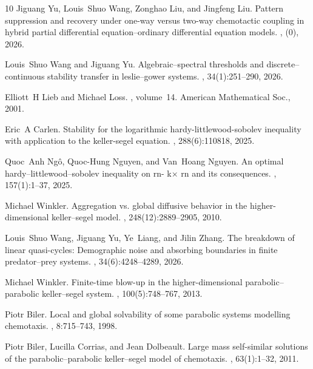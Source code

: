 \documentclass[pdflatex,sn-mathphys-num]{sn-jnl}%
\theoremstyle{thmstyleone}
\theoremstyle{thmstyletwo}
\theoremstyle{thmstylethree}
\begin{document}
\begin{thebibliography}{10}
Jiguang Yu, Louis~Shuo Wang, Zonghao Liu, and Jingfeng Liu.
\newblock Pattern suppression and recovery under one-way versus two-way chemotactic coupling in hybrid partial differential equation--ordinary differential equation models.
, (0), 2026.

Louis~Shuo Wang and Jiguang Yu.
\newblock Algebraic--spectral thresholds and discrete--continuous stability transfer in leslie--gower systems.
, 34(1):251--290, 2026.

Elliott~H Lieb and Michael Loss.
, volume~14.
\newblock American Mathematical Soc., 2001.

Eric~A Carlen.
\newblock Stability for the logarithmic hardy-littlewood-sobolev inequality with application to the keller-segel equation.
, 288(6):110818, 2025.

Quoc~Anh Ng{\^o}, Quoc-Hung Nguyen, and Van~Hoang Nguyen.
\newblock An optimal hardy--littlewood--sobolev inequality on rn- k$\times$ rn and its consequences.
, 157(1):1--37, 2025.

Michael Winkler.
\newblock Aggregation vs. global diffusive behavior in the higher-dimensional keller--segel model.
, 248(12):2889--2905, 2010.

Louis~Shuo Wang, Jiguang Yu, Ye~Liang, and Jilin Zhang.
\newblock The breakdown of linear quasi-cycles: Demographic noise and absorbing boundaries in finite predator--prey systems.
, 34(6):4248--4289, 2026.

Michael Winkler.
\newblock Finite-time blow-up in the higher-dimensional parabolic--parabolic keller--segel system.
, 100(5):748--767, 2013.

Piotr Biler.
\newblock Local and global solvability of some parabolic systems modelling chemotaxis.
, 8:715--743, 1998.

Piotr Biler, Lucilla Corrias, and Jean Dolbeault.
\newblock Large mass self-similar solutions of the parabolic--parabolic keller--segel model of chemotaxis.
, 63(1):1--32, 2011.


\end{thebibliography}
\end{document}
